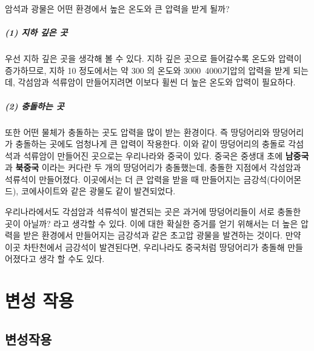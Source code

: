 \documentclass[12pt, a4paper, twoside]{book}
\begin{document}
			암석과 광물은 어떤 환경에서 높은 온도와 큰 압력을 받게 될까?

			\paragraph{(1) 지하 깊은 	곳}
			우선 지하 깊은 곳을 생각해 볼 수 있다. 
			지하 깊은 곳으로 들어갈수록 온도와 압력이 증가하므로, 지하 10 정도에서는 약 300 의 온도와 3000~4000기압의 압력을 받게 되는데, 각섬암과 석류암이 만들어지려면 이보다 휠씬 더 높은 온도와 압력이 필요하다.

			\paragraph{(2) 충돌하는 곳}
			또한 어떤 물체가 충돌하는 곳도 압력을 많이 받는 환경이다. 
			즉 땅덩어리와 땅덩어리가 충돌하는 곳에도 엄청나게 큰 압력이 작용한다. 
			이와 같이 땅덩어리의 충돌로 각섬석과 석류암이 만들어진 곳으로는 우리나라와 중국이 있다. 
			중국은 중생대 초에 \textbf{ 남중국 }과 \textbf{ 북중국 }이라는 커다란 두 개의 땅덩어리가 충돌했는데, 충돌한 지점에서 각섬암과 석류석이 만들어졌다. 
			이곳에서는 더 큰 압력을 받을 때 만들어지는 금강석(다이어몬드), 코에사이트와 같은 광물도 같이 발견되었다.

			우리나라에서도 각섬암과 석류석이 발견되는 곳은 과거에 땅덩어리들이 서로 충돌한 곳이 아닐까? 라고 생각할 수 있다. 
			이에 대한 확실한 증거를 얻기 위해서는 더 높은 압력을 받은 환경에서 만들어지는 금강석과 같은 초고압 광물을 발견하는 것이다. 
			만약 이곳 차탄천에서 금강석이 발견된다면, 우리나라도 중국처럼 땅덩어리가 충돌해 만들어졌다고 생각 할 수도 있다.
			
			
			




	\clearpage
	\chapter{변성 작용}
	\minitoc				%


	\clearpage
	\section{변성작용}
\end{document}
